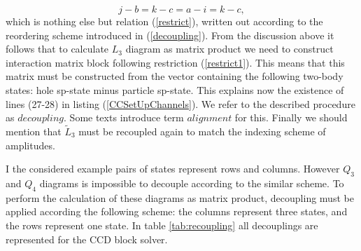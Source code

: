\documentclass[twoside,english]{uiofysmaster}
\begin{document}
\begin{equation}\label{restrict1}
j - b = k - c = a - i = k - c,
\end{equation}
which is nothing else but relation (\ref{restrict}), written out according to the reordering scheme introduced in (\ref{decoupling}).
From the discussion above it follows that to calculate $L_3$ diagram as matrix product we need to construct interaction matrix block following restriction (\ref{restrict1}). This means that this matrix must be constructed from the vector containing the following two-body states: hole sp-state minus particle sp-state. This explains now the existence of lines (27-28) in listing (\ref{CCSetUpChannels}). We refer to the described procedure as $decoupling$. Some texts\cite{HansenCoupledclusterstudies} \cite{MillerQuantumMechanicalStudies2017} introduce term $alignment$ for this.
Finally we should mention that $\tilde{L}_3$ must be recoupled again to match the indexing scheme of amplitudes.

I the considered example pairs of states represent rows and columns. However $Q_3$ and $Q_4$ diagrams is impossible to decouple according to the similar scheme. To perform the calculation of these diagrams as matrix product, decoupling must be applied according the following scheme: the columns represent three states, and the rows represent one state. In table \ref{tab:recoupling} all decouplings are represented for the CCD block solver.
\end{document}
